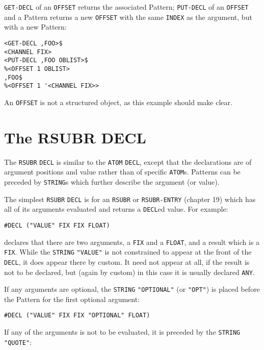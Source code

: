 \documentclass[a4paper]{scrbook}
\begin{document}
\texttt{GET-DECL} of an \texttt{OFFSET} returns the associated Pattern; \texttt{PUT-DECL}
 of an \texttt{OFFSET} and a Pattern returns a new \texttt{OFFSET} with the same \texttt{INDEX} as
the argument, but with a new Pattern:

\begin{verbatim}
<GET-DECL ,FOO>$
<CHANNEL FIX>
<PUT-DECL ,FOO OBLIST>$
%<OFFSET 1 OBLIST>
,FOO$
%<OFFSET 1 '<CHANNEL FIX>>
\end{verbatim}

An \texttt{OFFSET} is not a structured object, as this example should make clear.

\section{The RSUBR DECL}\label{the-rsubr-decl}

The \texttt{RSUBR} \texttt{DECL} is similar to the \texttt{ATOM} \texttt{DECL}, except that the declarations are of
argument positions and value rather than of specific \texttt{ATOM}s. Patterns can be preceded by \texttt{STRING}s which
further describe the argument (or value).

The simplest \texttt{RSUBR} \texttt{DECL} is for an \texttt{RSUBR} or \texttt{RSUBR-ENTRY} (chapter 19) which has all of
its arguments evaluated and returns a \texttt{DECL}ed value. For example:

\begin{verbatim}
#DECL ("VALUE" FIX FIX FLOAT)
\end{verbatim}

 declares that there are two arguments, a \texttt{FIX} and a \texttt{FLOAT}, and a result
which is a \texttt{FIX}. While the \texttt{STRING} \texttt{"VALUE"} is not constrained to appear at the front of the
\texttt{DECL}, it does appear there by custom. It need not appear at all, if the result is not to be declared, but (again
by custom) in this case it is usually declared \texttt{ANY}.

If any arguments are optional, the \texttt{STRING} \texttt{"OPTIONAL"}  (or \texttt{"OPT"})
 is placed before the Pattern for the first optional argument:

\begin{verbatim}
#DECL ("VALUE" FIX FIX "OPTIONAL" FLOAT)
\end{verbatim}

If any of the arguments is not to be evaluated, it is preceded by the \texttt{STRING} \texttt{"QUOTE"}:
\end{document}
